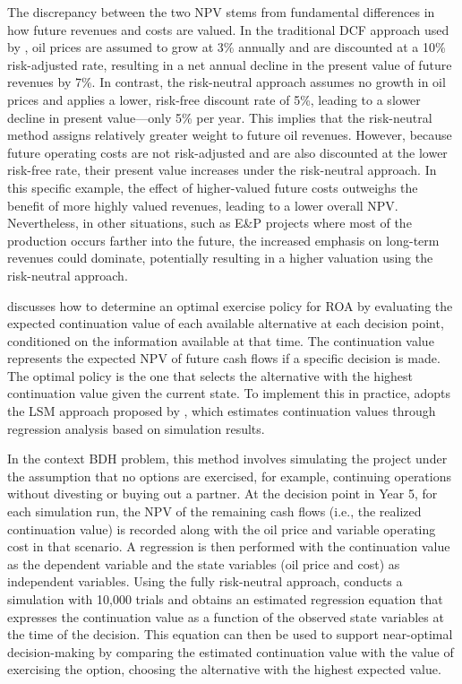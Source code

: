 \documentclass[pdflatex,sn-basic]{sn-jnl}%
\theoremstyle{thmstyleone}%
\theoremstyle{thmstyletwo}%
\theoremstyle{thmstylethree}%
\begin{document}
The discrepancy between the two NPV stems from fundamental differences in how future revenues and costs are valued. In the traditional DCF approach used by \cite{ref12a}, oil prices are assumed to grow at 3\% annually and are discounted at a 10\% risk-adjusted rate, resulting in a net annual decline in the present value of future revenues by 7\%. In contrast, the risk-neutral approach assumes no growth in oil prices and applies a lower, risk-free discount rate of 5\%, leading to a slower decline in present value—only 5\% per year. This implies that the risk-neutral method assigns relatively greater weight to future oil revenues. However, because future operating costs are not risk-adjusted and are also discounted at the lower risk-free rate, their present value increases under the risk-neutral approach. In this specific example, the effect of higher-valued future costs outweighs the benefit of more highly valued revenues, leading to a lower overall NPV. Nevertheless, in other situations, such as E\&P projects where most of the production occurs farther into the future, the increased emphasis on long-term revenues could dominate, potentially resulting in a higher valuation using the risk-neutral approach.

\cite{ref13} discusses how to determine an optimal exercise policy for ROA by evaluating the expected continuation value of each available alternative at each decision point, conditioned on the information available at that time. The continuation value represents the expected NPV of future cash flows if a specific decision is made. The optimal policy is the one that selects the alternative with the highest continuation value given the current state. To implement this in practice, \cite{ref13} adopts the LSM approach proposed by \cite{ref14}, which estimates continuation values through regression analysis based on simulation results.

In the context BDH problem, this method involves simulating the project under the assumption that no options are exercised, for example, continuing operations without divesting or buying out a partner. At the decision point in Year 5, for each simulation run, the NPV of the remaining cash flows (i.e., the realized continuation value) is recorded along with the oil price and variable operating cost in that scenario. A regression is then performed with the continuation value as the dependent variable and the state variables (oil price and cost) as independent variables. Using the fully risk-neutral approach, \cite{ref13} conducts a simulation with 10,000 trials and obtains an estimated regression equation that expresses the continuation value as a function of the observed state variables at the time of the decision. This equation can then be used to support near-optimal decision-making by comparing the estimated continuation value with the value of exercising the option, choosing the alternative with the highest expected value.
\end{document}
